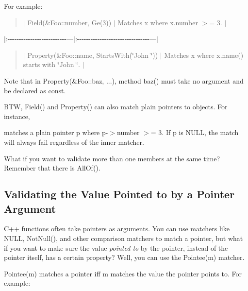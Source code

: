 For example\+:

\begin{quote}
$\vert$ {\ttfamily Field(\&\+Foo\+::number, Ge(3))} $\vert$ Matches {\ttfamily x} where {\ttfamily x.\+number $>$= 3}. $\vert$ \end{quote}
$\vert$\+:-\/-\/-\/-\/-\/-\/-\/-\/-\/-\/-\/-\/-\/-\/-\/-\/-\/-\/-\/-\/-\/-\/-\/-\/-\/-\/---$\vert$\+:-\/-\/-\/-\/-\/-\/-\/-\/-\/-\/-\/-\/-\/-\/-\/-\/-\/-\/-\/-\/-\/-\/-\/-\/-\/-\/-\/-\/-\/-\/-\/-\/---$\vert$ \begin{quote}
$\vert$ {\ttfamily Property(\&Foo\+::name, Starts\+With(\char`\"{}\+John \char`\"{}))} $\vert$ Matches {\ttfamily x} where {\ttfamily x.\+name()} starts with {\ttfamily \char`\"{}\+John \char`\"{}}. $\vert$ \end{quote}


Note that in {\ttfamily Property(\&\+Foo\+::baz, ...)}, method {\ttfamily baz()} must take no argument and be declared as {\ttfamily const}.

B\+TW, {\ttfamily Field()} and {\ttfamily Property()} can also match plain pointers to objects. For instance,


\begin{DoxyCode}{0}
\end{DoxyCode}


matches a plain pointer {\ttfamily p} where {\ttfamily p-\/$>$number $>$= 3}. If {\ttfamily p} is {\ttfamily N\+U\+LL}, the match will always fail regardless of the inner matcher.

What if you want to validate more than one members at the same time? Remember that there is {\ttfamily All\+Of()}.

\subsection*{Validating the Value Pointed to by a Pointer Argument}

C++ functions often take pointers as arguments. You can use matchers like {\ttfamily N\+U\+LL}, {\ttfamily Not\+Null()}, and other comparison matchers to match a pointer, but what if you want to make sure the value {\itshape pointed to} by the pointer, instead of the pointer itself, has a certain property? Well, you can use the {\ttfamily Pointee(m)} matcher.

{\ttfamily Pointee(m)} matches a pointer iff {\ttfamily m} matches the value the pointer points to. For example\+:


\begin{DoxyCode}{0}
\end{DoxyCode}


